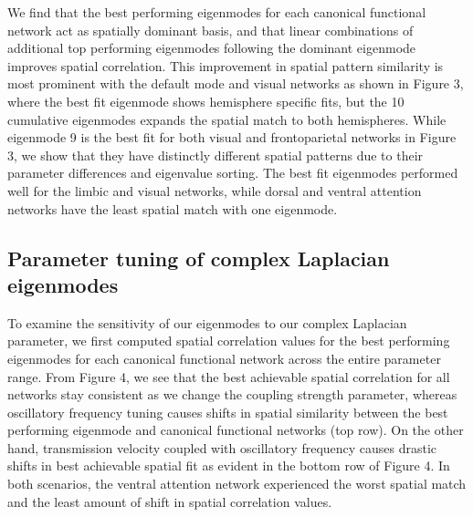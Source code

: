 \documentclass{article}
\begin{document}
We find that the best performing eigenmodes for each canonical functional network act as spatially dominant basis, and that linear combinations of additional top performing eigenmodes following the dominant eigenmode improves spatial correlation. This improvement in spatial pattern similarity is most prominent with the default mode and visual networks as shown in Figure 3, where the best fit eigenmode shows hemisphere specific fits, but the 10 cumulative eigenmodes expands the spatial match to both hemispheres. While eigenmode 9 is the best fit for both visual and frontoparietal networks in Figure 3, we show that they have distinctly different spatial patterns due to their parameter differences and eigenvalue sorting. The best fit eigenmodes performed well for the limbic and visual networks, while dorsal and ventral attention networks have the least spatial match with one eigenmode. 

\subsection{Parameter tuning of complex Laplacian eigenmodes}
To examine the sensitivity of our eigenmodes to our complex Laplacian parameter, we first computed spatial correlation values for the best performing eigenmodes for each canonical functional network across the entire parameter range. From Figure 4, we see that the best achievable spatial correlation for all networks stay consistent as we change the coupling strength parameter, whereas oscillatory frequency tuning causes shifts in spatial similarity between the best performing eigenmode and canonical functional networks (top row). On the other hand, transmission velocity coupled with oscillatory frequency causes drastic shifts in best achievable spatial fit as evident in the bottom row of Figure 4. In both scenarios, the ventral attention network experienced the worst spatial match and the least amount of shift in spatial correlation values. 
\end{document}
